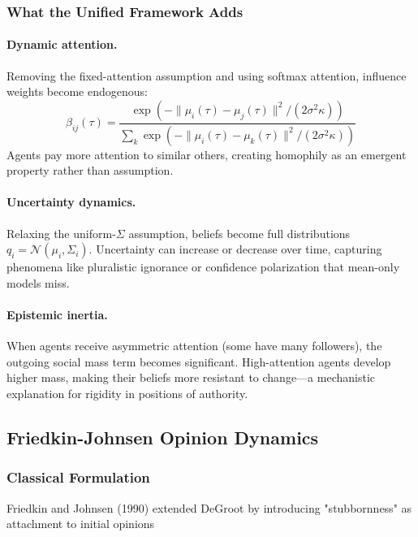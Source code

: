 \documentclass[12pt]{article}
\begin{document}
\subsubsection{What the Unified Framework Adds}

\paragraph{Dynamic attention.} Removing the fixed-attention assumption and using softmax attention, influence weights become endogenous:
\begin{equation}
\beta_{ij}(\tau) = \frac{\exp(-\|\mu_i(\tau) - \mu_j(\tau)\|^2 / (2\sigma^2\kappa))}{\sum_k \exp(-\|\mu_i(\tau) - \mu_k(\tau)\|^2 / (2\sigma^2\kappa))}
\end{equation}
Agents pay more attention to similar others, creating homophily as an emergent property rather than assumption.

\paragraph{Uncertainty dynamics.} Relaxing the uniform-$\Sigma$ assumption, beliefs become full distributions $q_i = \mathcal{N}(\mu_i, \Sigma_i)$. Uncertainty can increase or decrease over time, capturing phenomena like pluralistic ignorance or confidence polarization that mean-only models miss.

\paragraph{Epistemic inertia.} When agents receive asymmetric attention (some have many followers), the outgoing social mass term becomes significant. High-attention agents develop higher mass, making their beliefs more resistant to change---a mechanistic explanation for rigidity in positions of authority.

\subsection{Friedkin-Johnsen Opinion Dynamics}

\subsubsection{Classical Formulation}

Friedkin and Johnsen (1990) extended DeGroot by introducing "stubbornness" as attachment to initial opinions
\end{document}
